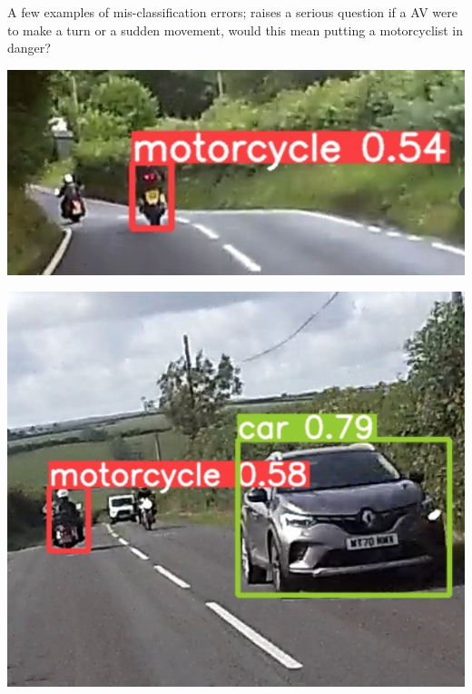 \documentclass[a0,portrait]{a0poster}
\begin{document}
\begin{multicols}{2}
		A few examples of mis-classification errors; raises a serious question if a AV were to make a turn or a sudden movement, would this mean putting a motorcyclist in danger?
			\begin{center}\vspace{1cm}
				\begin{minipage}{0.15\textwidth}
					\centering
					\includegraphics[width=\linewidth]{fail.png}
					\label{fig:detectionOfOne}
				\end{minipage}\hfill
				\begin{minipage}{0.15\textwidth}
					\centering
					\includegraphics[width=\linewidth]{left_turn.png}
					\label{fig:lateClassificationP1}
				\end{minipage}\hfill
				\begin{minipage}{0.15\textwidth}

\end{minipage}
\end{center}
\end{multicols}
\end{document}
